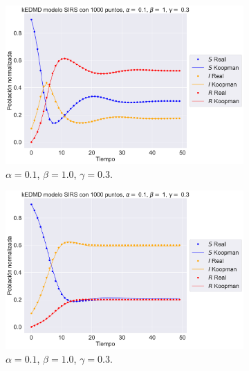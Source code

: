 \begin{figure}[h]
    \centering
    \begin{subfigure}[b]{0.45\textwidth}
        \centering
        \includegraphics[width=\textwidth]{img/content/chapter3/SIRS1.pdf}
        \caption{$\alpha=0.1$, $\beta = 1.0$, $\gamma = 0.3$.}
        \label{fig:SIRS1}
    \end{subfigure}
    \hfill
    \begin{subfigure}[b]{0.45\textwidth}
        \centering
        \includegraphics[width=\textwidth]{img/content/chapter3/SIRS2.pdf}
        \caption{$\alpha=0.1$, $\beta = 1.0$, $\gamma = 0.3$.}
        \label{fig:SIRS2}
    \end{subfigure}
    \hfill
    \begin{subfigure}[b]{0.45\textwidth}
        \centering

\end{subfigure}
\end{figure}
